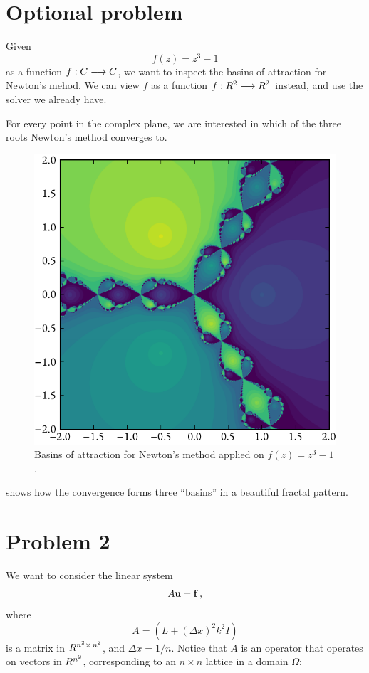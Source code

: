 \documentclass[12pt]{article}
\begin{document}
\begin{multicols}{2}
    \section*{Optional problem}
    Given
    \[
        f(z) = z^3 - 1
    \]
    as a function $f: \C \longrightarrow \C$, we want to inspect the basins
    of attraction for Newton's mehod.
    We can view $f$ as a function $f: \R^2 \longrightarrow \R^2$ instead,
    and use the solver we already have.

    For every point in the complex plane, we are interested in which
    of the three roots Newton's method converges to.
    \begin{figure}[H]
        \centering
        \includegraphics[width=0.75\columnwidth]{lores.pdf}
        \caption{
            Basins of attraction for Newton's method applied on
            $f(z) = z^3 - 1$.
        }
        \label{fig:basins}
    \end{figure}\noindent
     shows how the convergence forms three ``basins'' in
    a beautiful fractal pattern.


    \section*{Problem 2}
    We want to consider the linear system
    \[
        A \vec u = \vec f \,\text,
    \]
    where
    \[
        A = \left(
            L + (\Delta x)^2 k^2 I
        \right)
    \]
    is a matrix in $\R^{{n^2} \times\, {n^2}}$,
    and $\Delta x = 1/n$. Notice that $A$ is an operator
    that operates on vectors in $\R^{n^2}$, corresponding to
    an $n \times n$ lattice in a domain $\Omega$:


\end{multicols}
\end{document}
